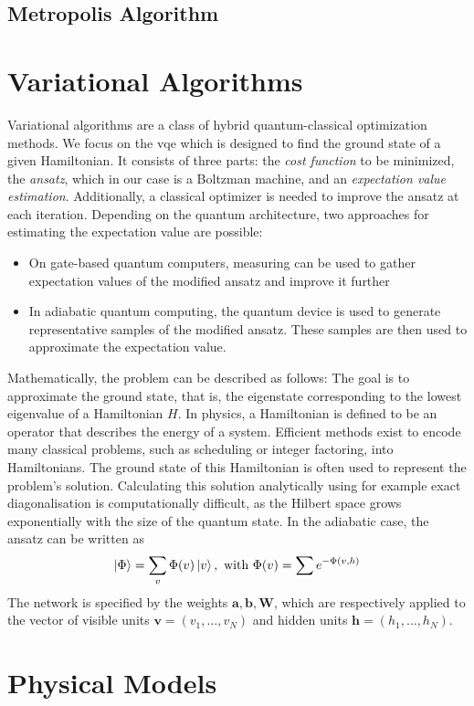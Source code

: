 \documentclass[10pt,a4paper]{article}
\begin{document}
\subsection{Metropolis Algorithm}

 
\section{Variational Algorithms}
Variational algorithms are a class of hybrid quantum-classical optimization methods. We focus on the \acrfull{vqe} which is designed to find the ground state of a given Hamiltonian. It consists of three parts: the \textit{cost function} to be minimized, the \textit{ansatz}, which in our case is a Boltzman machine, and an \textit{expectation value estimation}. Additionally, a classical optimizer is needed to improve the ansatz at each iteration. Depending on the quantum architecture, two approaches for estimating the expectation value are possible:
\begin{itemize}
	\item On gate-based quantum computers, measuring can be used to gather expectation values of the modified ansatz and improve it further
	\item In adiabatic quantum computing, the quantum device is used to generate representative samples of the modified ansatz. These samples are then used to approximate the expectation value. 
\end{itemize}
Mathematically, the problem can be described as follows:
The goal is to approximate the ground state, that is, the eigenstate corresponding to the lowest eigenvalue of a Hamiltonian $H$. In physics, a Hamiltonian is defined to be an operator that describes the energy of a system.  Efficient methods exist to encode many classical problems, such as scheduling or integer factoring, into Hamiltonians. The ground state of this Hamiltonian is often used to represent the problem's solution. Calculating this solution analytically using for example exact diagonalisation is computationally difficult, as the Hilbert space grows exponentially with the size of the quantum state.
In the adiabatic case, the ansatz can be written as 
\begin{equation}
\ket\Phi =\sum_v\Phi(v)\ket v, \text{ with } \Phi (v)= \sum e^{-\Phi(v,h)}
\end{equation}
The network is specified by the weights $\bm a, \bm b, \bm W$, which are respectively applied to the vector of visible units $\bm v=(v_1, \ldots, v_N)$ and hidden units $\bm h=(h_1, \ldots, h_N)$. 

\section{Physical Models}
\end{document}
